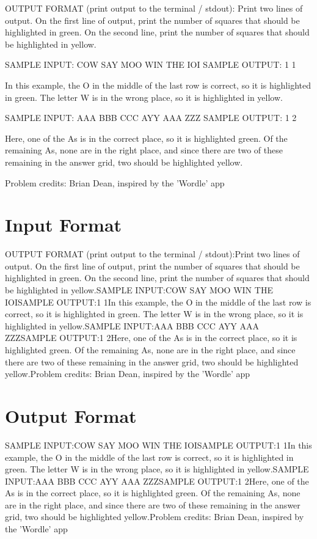 \documentclass[12pt]{article}
\begin{document}
OUTPUT FORMAT (print output to the terminal / stdout):
Print two lines of output.  On the first line of output, print the number of
squares that should be highlighted in green. On the second line, print the
number of squares that should be highlighted in yellow.

SAMPLE INPUT:
COW
SAY
MOO
WIN
THE
IOI
SAMPLE OUTPUT: 
1
1

In this example, the O in the middle of the last row is correct, so it is 
highlighted in green.  The letter W is in the wrong place, so it is highlighted
in yellow.

SAMPLE INPUT:
AAA
BBB
CCC
AYY
AAA
ZZZ
SAMPLE OUTPUT: 
1
2

Here, one of the As is in the correct place, so it is highlighted green.  Of
the remaining As, none are in the right place, and since there are two of these
remaining in the answer grid, two should be highlighted yellow.

Problem credits: Brian Dean, inspired by the 'Wordle' app



\section*{Input Format}
OUTPUT FORMAT (print output to the terminal / stdout):Print two lines of output.  On the first line of output, print the number of
squares that should be highlighted in green. On the second line, print the
number of squares that should be highlighted in yellow.SAMPLE INPUT:COW
SAY
MOO
WIN
THE
IOISAMPLE OUTPUT:1
1In this example, the O in the middle of the last row is correct, so it is 
highlighted in green.  The letter W is in the wrong place, so it is highlighted
in yellow.SAMPLE INPUT:AAA
BBB
CCC
AYY
AAA
ZZZSAMPLE OUTPUT:1
2Here, one of the As is in the correct place, so it is highlighted green.  Of
the remaining As, none are in the right place, and since there are two of these
remaining in the answer grid, two should be highlighted yellow.Problem credits: Brian Dean, inspired by the 'Wordle' app

\section*{Output Format}
SAMPLE INPUT:COW
SAY
MOO
WIN
THE
IOISAMPLE OUTPUT:1
1In this example, the O in the middle of the last row is correct, so it is 
highlighted in green.  The letter W is in the wrong place, so it is highlighted
in yellow.SAMPLE INPUT:AAA
BBB
CCC
AYY
AAA
ZZZSAMPLE OUTPUT:1
2Here, one of the As is in the correct place, so it is highlighted green.  Of
the remaining As, none are in the right place, and since there are two of these
remaining in the answer grid, two should be highlighted yellow.Problem credits: Brian Dean, inspired by the 'Wordle' app
\end{document}
